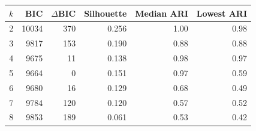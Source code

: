 \begin{tabular}{crrrrr}
\toprule
$k$ & BIC & $\Delta$BIC & Silhouette & Median ARI & Lowest ARI\\
\midrule
2 & 10034 & 370 & 0.256 & 1.00 & 0.98\\
3 & 9817 & 153 & 0.190 & 0.88 & 0.88\\
4 & 9675 & 11 & 0.138 & 0.98 & 0.97\\
5 & 9664 & 0 & 0.151 & 0.97 & 0.59\\
6 & 9680 & 16 & 0.129 & 0.68 & 0.49\\
7 & 9784 & 120 & 0.120 & 0.57 & 0.52\\
8 & 9853 & 189 & 0.061 & 0.53 & 0.42\\
\bottomrule
\end{tabular}
